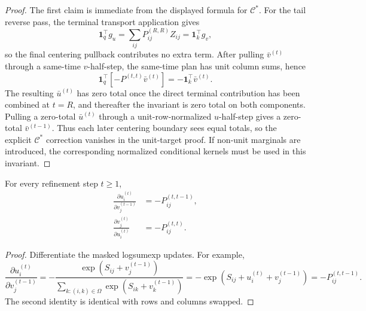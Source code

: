 \begin{proof}
The first claim is immediate from the displayed formula for $\mathcal C^*$.
For the tail reverse pass, the terminal transport application gives
\[
\mathbf{1}_q^\top g_u
=
\sum_{ij}P_{ij}^{(R,R)}Z_{ij}
=
\mathbf{1}_k^\top g_v,
\]
so the final centering pullback contributes no extra term. After pulling $\bar v^{(t)}$ through a same-time $v$-half-step, the same-time plan has unit column sums, hence
\[
\mathbf{1}_q^\top\!\left[-P^{(t,t)}\bar v^{(t)}\right]
=
-\mathbf{1}_k^\top\bar v^{(t)}.
\]
The resulting $\bar u^{(t)}$ has zero total once the direct terminal contribution has been combined at $t=R$, and thereafter the invariant is zero total on both components. Pulling a zero-total $\bar u^{(t)}$ through a unit-row-normalized $u$-half-step gives a zero-total $\bar v^{(t-1)}$. Thus each later centering boundary sees equal totals, so the explicit $\mathcal C^*$ correction vanishes in the unit-target proof. If non-unit marginals are introduced, the corresponding normalized conditional kernels must be used in this invariant.
\end{proof}

\begin{lemma}
For every refinement step $t\ge 1$,
\begin{align}
    \frac{\partial u_i^{(t)}}{\partial v_j^{(t-1)}} &= -P_{ij}^{(t,t-1)}, \\
    \frac{\partial v_j^{(t)}}{\partial u_i^{(t)}} &= -P_{ij}^{(t,t)}.
\end{align}
\end{lemma}

\begin{proof}
Differentiate the masked logsumexp updates. For example,
\[
\frac{\partial u_i^{(t)}}{\partial v_j^{(t-1)}}
=
-
\frac{\exp(S_{ij}+v_j^{(t-1)})}{\sum_{k:(i,k)\in\Omega}\exp(S_{ik}+v_k^{(t-1)})}
=
-\exp(S_{ij}+u_i^{(t)}+v_j^{(t-1)})
=
-P_{ij}^{(t,t-1)}.
\]
The second identity is identical with rows and columns swapped.
\end{proof}

